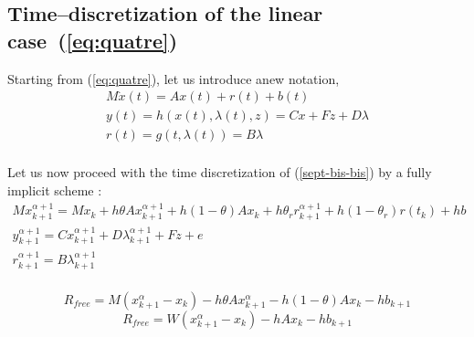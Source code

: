  

\subsection{Time--discretization of the linear case~(\ref{eq:quatre}) } 


Starting from  (\ref{eq:quatre}), let us introduce anew notation, 
\begin{equation}
\begin{array}{l}
M \dot{x}(t) = Ax(t) + r(t)  +b(t)\\[2mm]
y(t) = h(x(t),\lambda (t),z) = Cx + Fz + D \lambda  \\[2mm]
r(t) = g(t,\lambda (t) ) = B \lambda \\[2mm]
\end{array}
\label{sept-bis-bis}
\end{equation}

Let us now proceed with the time discretization of (\ref{sept-bis-bis}) by a fully implicit scheme : 
\begin{equation}
  \begin{array}{l}
    \label{eq:toto1}
     M x^{\alpha+1}_{k+1} = M x_{k} +h\theta A x^{\alpha+1}_{k+1}+h(1-\theta) A x_k + h \theta _r r^{\alpha+1}_{k+1}+ h(1-\theta _r)r(t_k)  +hb\\[2mm]
     y^{\alpha+1}_{k+1} =  C x^{\alpha+1}_{k+1} + D \lambda ^{\alpha+1}_{k+1} +Fz +e\\[2mm]
     r^{\alpha+1}_{k+1} = B \lambda ^{\alpha+1}_{k+1} \\[2mm]
  \end{array}
\end{equation}

\[R_{free} = M(x^{\alpha}_{k+1} - x_{k}) -h\theta A x^{\alpha}_{k+1} - h(1-\theta) A x_k -hb_{k+1} \]
\[R_{free} = W(x^{\alpha}_{k+1} - x_{k}) -h A x_{k} -hb_{k+1} \]

